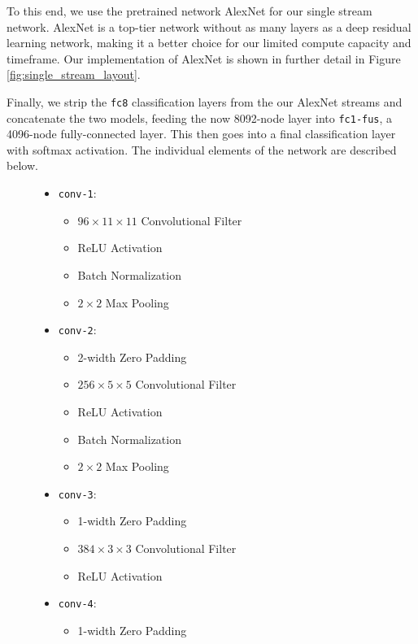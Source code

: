 To this end, we use the pretrained network AlexNet for our single stream network. AlexNet is a top-tier network without as many layers as a deep residual learning network, making it a better choice for our limited compute capacity and timeframe. Our implementation of AlexNet is shown in further detail in Figure \ref{fig:single_stream_layout}. 

Finally, we strip the \texttt{fc8} classification layers from the our AlexNet streams and concatenate the two models, feeding the now 8092-node layer into \texttt{fc1-fus}, a 4096-node fully-connected layer. This then goes into a final classification layer with softmax activation. The individual elements of the network are described below.

\begin{figure}[htbp]
	\begin{mdframed}
		\begin{itemize}
			\item \texttt{conv-1}:
			\begin{itemize}
				\item $96 \times 11 \times 11$ Convolutional Filter
				\item ReLU Activation
				\item Batch Normalization
				\item $2 \times 2$ Max Pooling
			\end{itemize}
			\item \texttt{conv-2}:
			\begin{itemize}
				\item 2-width Zero Padding
				\item $256 \times 5 \times 5$ Convolutional Filter
				\item ReLU Activation
				\item Batch Normalization
				\item $2 \times 2$ Max Pooling
			\end{itemize}
			\item \texttt{conv-3}:
			\begin{itemize}
				\item 1-width Zero Padding
				\item $384 \times 3 \times 3$ Convolutional Filter
				\item ReLU Activation
			\end{itemize}
			\item \texttt{conv-4}:
			\begin{itemize}
				\item 1-width Zero Padding

\end{itemize}
\end{itemize}
\end{mdframed}
\end{figure}
